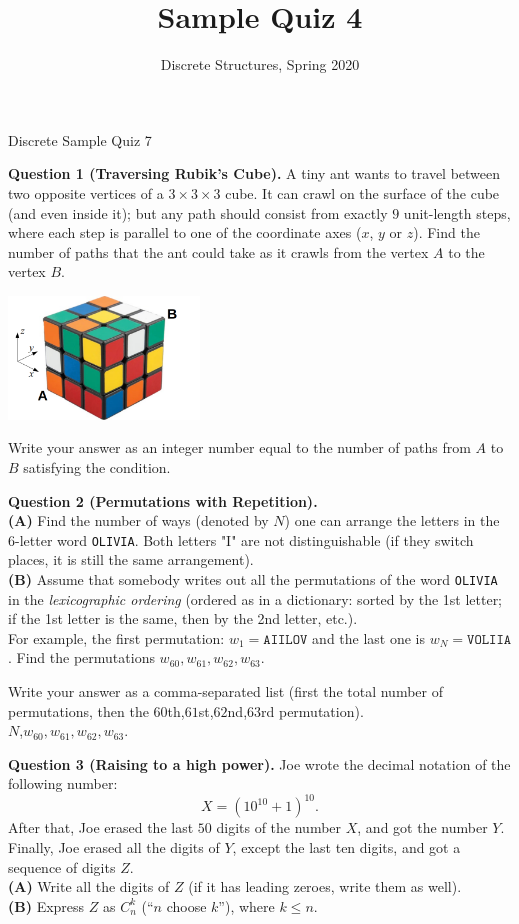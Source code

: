 \documentclass[jou]{apa6}
\title{Sample Quiz 4}
\author{Discrete Structures, Spring 2020}
\affiliation{RBS}
\begin{document}
\thispagestyle{empty}

\twocolumn
{\Large Discrete Sample Quiz 7}

\vspace{10pt}
{\bf Question 1 (Traversing Rubik's Cube).} A tiny ant wants to travel 
between two opposite vertices of a $3 \times 3 \times 3$ cube. It can crawl
on the surface of the cube (and even inside it); but any path should consist from exactly $9$ unit-length
steps, where each step is parallel to one of the coordinate axes ($x$, $y$ or $z$). 
Find the number of paths that the ant could take as it crawls from the vertex $A$ to the vertex $B$. 
\begin{center}
\includegraphics[width=2in]{rubiks-cube.png}
\end{center}

Write your answer as an integer number equal to the number of paths from $A$ to $B$ satisfying the condition.






\vspace{6pt}
{\bf Question 2 (Permutations with Repetition).}\\
{\bf (A)} Find the number of ways (denoted by $N$) one can arrange the letters in the 6-letter word {\tt OLIVIA}. 
Both letters "I" are not distinguishable (if they switch places, it is still the same arrangement).\\
{\bf (B)} Assume that somebody writes out all the permutations of the word {\tt OLIVIA} 
in the {\em lexicographic ordering} (ordered as in a dictionary: sorted by the 1st letter; 
if the 1st letter is the same, then by the 2nd letter, etc.).\\
For example, the first permutation: $w_1 = \mathtt{AIILOV}$ and the last one is $w_N = \mathtt{VOLIIA}$. 
Find the permutations $w_{60},w_{61},w_{62},w_{63}$. 

Write your answer as a comma-separated list (first the total number of permutations, then the
$60$th,$61$st,$62$nd,$63$rd permutation).\\
$N$,$w_{60},w_{61},w_{62},w_{63}$. 


\vspace{6pt}
{\bf Question 3 (Raising to a high power).} 
Joe wrote the decimal notation of the following number:
$$X = \left( 10^{10} + 1 \right)^{10}.$$
After that, Joe erased the last $50$ digits of the number $X$, and got the number $Y$. 
Finally, Joe erased all the digits of $Y$, except the last ten digits, and got a sequence of digits $Z$.\\
{\bf (A)} Write all the digits of $Z$ (if it has leading zeroes, write them as well).\\
{\bf (B)} Express $Z$ as $C_n^k$ (``$n$ choose $k$''), where $k \leq n$.
\end{document}
